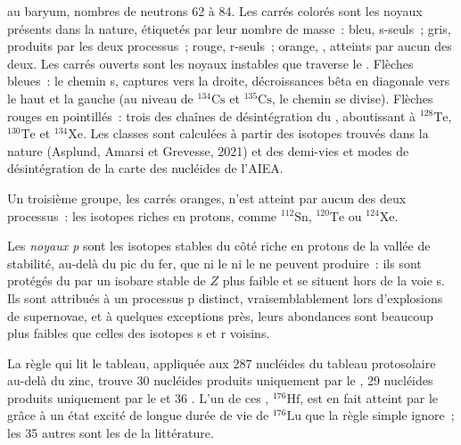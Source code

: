 \begin{omfigure}
{au baryum, nombres de neutrons 62 à 84. Les carrés colorés sont les noyaux présents dans la nature, étiquetés
par leur nombre de masse~: bleu, s-seuls~; gris, produits par les deux processus~; rouge,
r-seuls~; orange, , atteints par aucun des deux. Les carrés ouverts sont les
noyaux instables que traverse le . Flèches bleues~: le chemin s,
captures vers la droite, décroissances bêta en diagonale vers le haut et la gauche (au niveau de
$^{134}\mathrm{Cs}$ et $^{135}\mathrm{Cs}$, le chemin se divise). Flèches rouges
en pointillés~: trois des chaînes de désintégration du , aboutissant à
$^{128}\mathrm{Te}$, $^{130}\mathrm{Te}$ et $^{134}\mathrm{Xe}$. Les
classes sont calculées à partir des isotopes trouvés dans la nature (Asplund,
Amarsi et Grevesse, 2021) et des demi-vies et modes de désintégration de la
carte des nucléides de l'AIEA.}\label{fig:b3:origin-of-elements:chart}
\end{omfigure}

Un troisième groupe, les carrés oranges, n'est atteint par aucun des deux processus~: les
isotopes riches en protons, comme $^{112}\mathrm{Sn}$, $^{120}\mathrm{Te}$
ou $^{124}\mathrm{Xe}$.

\begin{definition}[noyaux p]\label{def:b3:origin-of-elements:p-process}
Les \emph{noyaux p} sont les isotopes stables du
côté riche en protons de la vallée de stabilité, au-delà du pic du fer, que
ni le  ni le  ne peuvent produire~: ils sont protégés du
 par un isobare stable de $Z$ plus faible et se situent hors de la voie s. Ils sont
attribués à un processus p distinct, vraisemblablement lors d'explosions de supernovae, et
à quelques exceptions près, leurs abondances sont beaucoup plus faibles que celles des
isotopes s et r voisins.
\end{definition}

La règle qui lit le tableau, appliquée aux 287 nucléides du
tableau protosolaire au-delà du zinc, trouve 30 nucléides produits uniquement par le , 29 nucléides produits uniquement par le 
et 36 . L'un de ces , $^{176}\mathrm{Hf}$, est en fait
atteint par le  grâce à un état excité de longue durée de vie de
$^{176}\mathrm{Lu}$ que la règle simple ignore~; les 35 autres sont les 
de la littérature.

